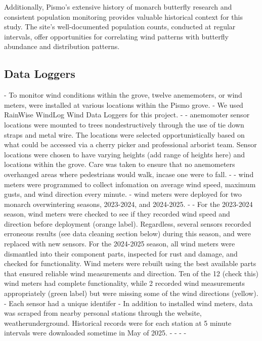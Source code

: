 Additionally, Pismo's extensive history of monarch butterfly research and consistent population monitoring provides valuable historical context for this study. The site's well-documented population counts, conducted at regular intervals, offer opportunities for correlating wind patterns with butterfly abundance and distribution patterns.

\subsection{Data Loggers}

- To monitor wind conditions within the grove, twelve anememoters, or wind meters, were installed at various locations within the Pismo grove.
- We used RainWise WindLog Wind Data Loggers for this project. 
- %
- anemomoter sensor locations were mounted to trees nondestructively through the use of tie down straps and metal wire. The locations were selected opportunistically based on what could be accessed via a cherry picker and professional arborist team. Sensor locations were chosen to have varying heights (add range of heights here) and locations within the grove. Care was taken to ensure that no anemometers overhanged areas where pedestrians would walk, incase one were to fall.
- %
- wind meters were programmed to collect infomation on average wind speed, maximum gusts, and wind direction every minute. 
- wind meters were deployed for two monarch overwintering seasons, 2023-2024, and 2024-2025. 
- %
- For the 2023-2024 season, wind meters were checked to see if they recorded wind speed and direction before deployment (orange label). Regardless, several sensors recorded erroneous results (see data cleaning section below) during this season, and were replaced with new sensors. For the 2024-2025 season, all wind meters were dismantled into their component parts, inspected for rust and damage, and checked for functionality. Wind meters were rebuilt using the best available parts that ensured reliable wind measurements and direction. Ten of the 12 (check this) wind meters had complete functionality, while 2 recorded wind measurements appropriately (green label) but were missing some of the wind directions (yellow). 
- Each sensor had a unique identifer
- In addition to installed wind meters, data was scraped from nearby personal stations through the website, weatherunderground. Historical records were for each station at 5 minute intervals were downloaded sometime in May of 2025. 
- %
- %
- %
- %



